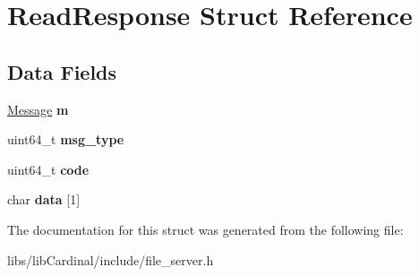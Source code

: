\hypertarget{structReadResponse}{}\section{Read\+Response Struct Reference}
\label{structReadResponse}
\subsection*{Data Fields}
\begin{DoxyCompactItemize}
\item 
\hyperlink{structMessage}{Message} {\bfseries m}\hypertarget{structReadResponse_af10e25c154d8888e0c394f14c65c30f7}{}\label{structReadResponse_af10e25c154d8888e0c394f14c65c30f7}

\item 
uint64\+\_\+t {\bfseries msg\+\_\+type}\hypertarget{structReadResponse_acf7b5b446176a736e743b6470830cff7}{}\label{structReadResponse_acf7b5b446176a736e743b6470830cff7}

\item 
uint64\+\_\+t {\bfseries code}\hypertarget{structReadResponse_a357668205f7cb9ed0dd001ed6e610dc6}{}\label{structReadResponse_a357668205f7cb9ed0dd001ed6e610dc6}

\item 
char {\bfseries data} \mbox{[}1\mbox{]}\hypertarget{structReadResponse_a8ec14afd81f9e8a11584f679d45034ce}{}\label{structReadResponse_a8ec14afd81f9e8a11584f679d45034ce}

\end{DoxyCompactItemize}


The documentation for this struct was generated from the following file\+:\begin{DoxyCompactItemize}
\item 
libs/lib\+Cardinal/include/file\+\_\+server.\+h\end{DoxyCompactItemize}
